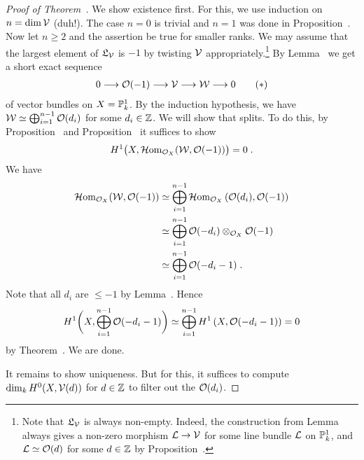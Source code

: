 \documentclass[a4paper,parskip=half,numbers=enddot, DIV=12]{scrreprt}
\begin{document}
\begin{proof}[Proof of Theorem~]
	We show existence first. For this, we use induction on $n=\dim\mathcal{V}$ (duh!). The case $n=0$ is trivial and $n=1$ was done in Proposition~. Now let $n\geq 2$ and the assertion be true for smaller ranks. We may assume that the largest element of $\mathfrak{L}_{\mathcal{V}}$ is $-1$ by twisting $\mathcal{V}$ appropriately.\footnote{Note that $\mathfrak{L}_{\mathcal{V}}$ is always non-empty. Indeed, the construction from Lemma~ always gives a non-zero morphism $\Ll\morphism\Vv$ for some line bundle $\mathcal{L}$ on $\mathbb{P}_k^1$, and $\mathcal{L}\simeq\mathcal{O}(d)$ for some $d\in\mathbb{Z}$ by Proposition~.} By Lemma~ we get a short exact sequence
	\begin{align}\lbl{eq:ExactSeq}
		0\morphism\Oo(-1)\morphism\Vv\morphism\Ww\morphism 0\tag{$*$}
	\end{align}
	of vector bundles on $X=\mathbb{P}_k^1$. By the induction hypothesis, we have $\mathcal{W}\simeq\bigoplus_{i=1}^{n-1}\mathcal{O}(d_i)$ for some $d_i\in\mathbb{Z}$. We will show that  splits. To do this, by Proposition~ and Proposition~ it suffices to show 
	\begin{align*}
		H^1\big(X,\operatorname{\mathcal{H} om}_{\mathcal{O}_X}(\mathcal{W},\mathcal{O}(-1))\big)=0\;. 
	\end{align*}
	We have 
	\begin{align*}
		\operatorname{\mathcal{H} om}_{\mathcal{O}_X}(\mathcal{W},\mathcal{O}(-1))&\simeq\bigoplus_{i=1}^{n-1}\operatorname{\mathcal{H} om}_{\mathcal{O}_X}\left(\mathcal{O}(d_i),\mathcal{O}(-1)\right)\\
		&\simeq \bigoplus_{i=1}^{n-1}\mathcal{O}(-d_i)\otimes_{\mathcal{O}_X}\mathcal{O}(-1)\\&\simeq \bigoplus_{i=1}^{n-1}\mathcal{O}(-d_i-1)\;.
	\end{align*}
	Note that all $d_i$ are $\leq -1$ by Lemma~. Hence
	\begin{align*}
		H^1\bigg(X,\bigoplus_{i=1}^{n-1}\mathcal{O}(-d_i-1)\bigg)\simeq \bigoplus_{i=1}^{n-1}H^1\left(X,\mathcal{O}(-d_i-1)\right)=0
	\end{align*}
	by Theorem~. We are done.
	
	It remains to show uniqueness. But for this, it suffices to compute $\dim_kH^0(X,\mathcal{V}(d))$ for $d\in\mathbb{Z}$ to filter out the $\mathcal{O}(d_i)$.
\end{proof}

\printbibliography
\end{document}
